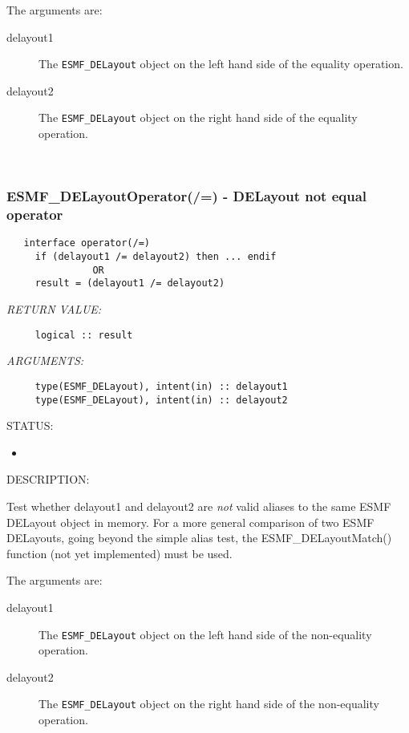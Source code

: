      The arguments are:
     \begin{description}
     \item[delayout1]
       The {\tt ESMF\_DELayout} object on the left hand side of the equality
       operation.
     \item[delayout2]
       The {\tt ESMF\_DELayout} object on the right hand side of the equality
       operation.
     \end{description}
   
 
\mbox{}\hrulefill\ 
 
\subsubsection [ESMF\_DELayoutOperator(/=)] {ESMF\_DELayoutOperator(/=) - DELayout not equal operator}


  
\begin{verbatim}   interface operator(/=)
     if (delayout1 /= delayout2) then ... endif
               OR
     result = (delayout1 /= delayout2)\end{verbatim}{\em RETURN VALUE:}
\begin{verbatim}     logical :: result\end{verbatim}{\em ARGUMENTS:}
\begin{verbatim}     type(ESMF_DELayout), intent(in) :: delayout1
     type(ESMF_DELayout), intent(in) :: delayout2\end{verbatim}
{\sf STATUS:}
   \begin{itemize}
   \item{}
   \end{itemize}
  
{\sf DESCRIPTION:\\ }


     Test whether delayout1 and delayout2 are {\it not} valid aliases to the
     same ESMF DELayout object in memory. For a more general comparison of two
     ESMF DELayouts, going beyond the simple alias test, the 
     ESMF\_DELayoutMatch() function (not yet implemented) must
     be used.
  
     The arguments are:
     \begin{description}
     \item[delayout1]
       The {\tt ESMF\_DELayout} object on the left hand side of the non-equality
       operation.
     \item[delayout2]
       The {\tt ESMF\_DELayout} object on the right hand side of the non-equality
       operation.
     \end{description}
   
